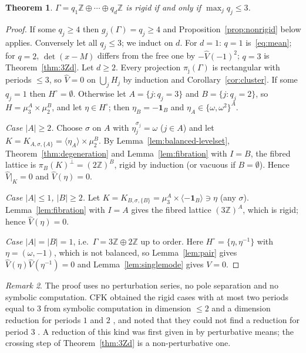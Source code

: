 \documentclass[11pt,reqno]{amsart}
\newtheorem{theorem}{Theorem}[section]
\theoremstyle{definition}
\theoremstyle{remark}
\newtheorem{remark}[theorem]{Remark}
\newcommand{\Z}{\mathbb Z}
\begin{document}
\begin{theorem}\label{thm:rect}
$\Gamma=q_1\Z\oplus\cdots\oplus q_d\Z$ is rigid if and only if $\max_jq_j\le3$.
\end{theorem}

\begin{proof}
If some $q_j\ge4$ then $g_j(\Gamma)=q_j\ge4$ and Proposition~\ref{prop:nonrigid}
below applies.  Conversely let all $q_j\le3$; we induct on $d$.  For $d=1$:
$q=1$ is~\eqref{eq:mean}; for $q=2$, $\det(x-M)$ differs from the free one by
$-\widehat V(-1)^2$; $q=3$ is Theorem~\ref{thm:3Zd}.  Let $d\ge2$.  Every
projection $\pi_{\hat\jmath}(\Gamma)$ is rectangular with periods $\le3$, so
$\widehat V=0$ on $\bigcup_jH_j$ by induction and Corollary~\ref{cor:cluster}.  If
some $q_j=1$ then $H^\circ=\emptyset$.  Otherwise let $A=\{j:q_j=3\}$ and
$B=\{j:q_j=2\}$, so $H=\mu_3^A\times\mu_2^B$, and let $\eta\in H^\circ$; then
$\eta_B=-\mathbf 1_B$ and $\eta_A\in\{\omega,\omega^2\}^A$.

\emph{Case $|A|\ge2$.}  Choose $\sigma$ on $A$ with $\eta_j^{\sigma_j}=\omega$
($j\in A$) and let $K=K_{A,\sigma,\{A\}}=\langle\eta_A\rangle\times\mu_2^B$.  By
Lemma~\ref{lem:balanced-levelset}, Theorem~\ref{thm:degeneration} and
Lemma~\ref{lem:fibration} with $I=B$, the fibred lattice is
$\pi_B(K)^\perp=(2\Z)^B$, rigid by induction (or vacuous if $B=\emptyset$).
Hence $\widehat V|_K=0$ and $\widehat V(\eta)=0$.

\emph{Case $|A|\le1$, $|B|\ge2$.}  Let $K=K_{B,\sigma,\{B\}}=\mu_3^A\times\langle-\mathbf 1_B\rangle\ni\eta$
(any $\sigma$).  Lemma~\ref{lem:fibration} with $I=A$ gives the fibred lattice
$(3\Z)^A$, which is rigid; hence $\widehat V(\eta)=0$.

\emph{Case $|A|=|B|=1$}, i.e.\ $\Gamma=3\Z\oplus2\Z$ up to order.  Here
$H^\circ=\{\eta,\eta^{-1}\}$ with $\eta=(\omega,-1)$, which is not balanced, so
Lemma~\ref{lem:pair} gives $\widehat V(\eta)\widehat V(\eta^{-1})=0$ and
Lemma~\ref{lem:singlemode} gives $V=0$.
\end{proof}

\begin{remark}
The proof uses no perturbation series, no pole separation and no symbolic
computation.  CFK obtained the rigid cases with at most two periods equal to
$3$ from symbolic computation in dimension $\le2$ and a dimension reduction
for periods $1$ and $2$ \cite[Proposition~4.2]{CFK2026}, and noted that they
could not find a reduction for period $3$ \cite[Section~4.4]{CFK2026}.  A
reduction of this kind was first given in \cite[Part~12]{KeioGPT} by
perturbative means; the crossing step of Theorem~\ref{thm:3Zd} is a
non-perturbative one.
\end{remark}
\end{document}
